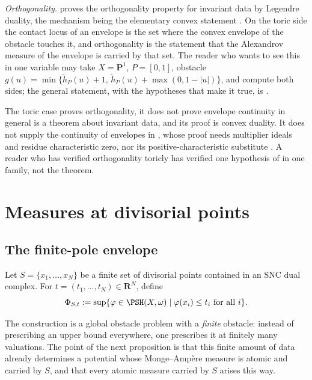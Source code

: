 \emph{Orthogonality.}   proves the
orthogonality property  for invariant
data by Legendre duality, the mechanism being the elementary convex
statement .  On the toric side the
contact locus of an envelope is the set where the convex envelope of the
obstacle touches it, and orthogonality is the statement that the Alexandrov
measure of the envelope is carried by that set.  The reader who wants to see
this in one variable may take \(X=\mathbf P^1\), \(P=[0,1]\), obstacle
\(g(u)=\min\{\check h_P(u)+1,\,\check h_P(u)+\max(0,1-|u|)\}\), and compute
both sides; the general statement, with the hypotheses that make it true, is
.

\begin{warning}{The toric case proves orthogonality, it does not prove
envelope continuity in general}
 is a theorem about invariant data, and
its proof is convex duality.  It does not supply the continuity of envelopes
in , whose proof needs multiplier ideals
and residue characteristic zero, nor its positive-characteristic substitute
.  A reader who has verified
orthogonality toricly has verified one hypothesis of
 in one family, not the theorem.
\end{warning}

\section{Measures at divisorial points}
\label{sec:ch31-divisorial}

\subsection{The finite-pole envelope}
\label{sec:ch31-finite-pole}

Let \(S=\{x_1,\ldots,x_N\}\) be a finite set of divisorial points contained
in an SNC dual complex.  For \(t=(t_1,\ldots,t_N)\in\mathbf R^N\), define
\begin{equation}
 \Phi_{S,t}:=\sup\{\varphi\in\PSH(X,\omega)\mid
                         \varphi(x_i)\leq t_i\text{ for all }i\}.
\label{eq:finite-pole-envelope}
\end{equation}

The construction is a global obstacle problem with a \emph{finite} obstacle:
instead of prescribing an upper bound everywhere, one prescribes it at
finitely many valuations.  The point of the next proposition is that this
finite amount of data already determines a potential whose Monge--Amp\`ere
measure is atomic and carried by \(S\), and that every atomic measure
carried by \(S\) arises this way.


